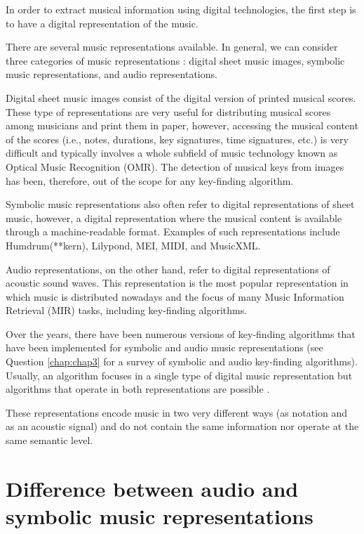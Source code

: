 In order to extract musical information using digital technologies, the first step is to have a digital representation of the music.

There are several music representations available. In general, we can consider three categories of music representations \cite{muller2015music}: digital sheet music images, symbolic music representations, and audio representations.

Digital sheet music images consist of the digital version of printed musical scores. These type of representations are very useful for distributing musical scores among musicians and print them in paper, however, accessing the musical content of the scores (i.e., notes, durations, key signatures, time signatures, etc.) is very difficult and typically involves a whole subfield of music technology known as Optical Music Recognition (OMR). The detection of musical keys from images has been, therefore, out of the scope for any key-finding algorithm.

Symbolic music representations also often refer to digital representations of sheet music, however, a digital representation where the musical content is available through a machine-readable format. Examples of such representations include Humdrum(**kern), Lilypond, MEI, MIDI, and MusicXML.

Audio representations, on the other hand, refer to digital representations of acoustic sound waves. This representation is the most popular representation in which music is distributed nowadays and the focus of many Music Information Retrieval (MIR) tasks, including key-finding algorithms.

Over the years, there have been numerous versions of key-finding algorithms that have been implemented for symbolic and audio music representations (see Question \ref{chap:chap3} for a survey of symbolic and audio key-finding algorithms). Usually, an algorithm focuses in a single type of digital music representation but algorithms that operate in both representations are possible \cite{napoleslopez2019keyfinding}.

These representations encode music in two very different ways (as notation and as an acoustic signal) and do not contain the same information nor operate at the same semantic level.

\section{Difference between audio and symbolic music representations}

